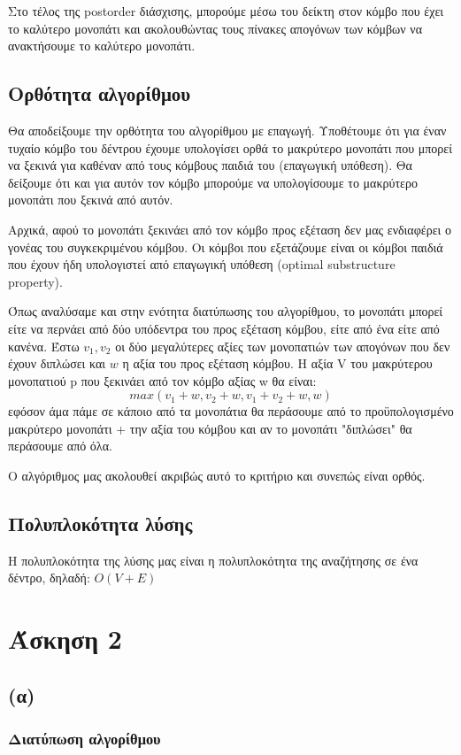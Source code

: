 \documentclass[a4paper,oneside, 11pt]{article}
\begin{document}
Στο τέλος της postorder διάσχισης, μπορούμε μέσω του δείκτη στον κόμβο που έχει το καλύτερο μονοπάτι και ακολουθώντας τους πίνακες απογόνων των κόμβων να ανακτήσουμε το καλύτερο μονοπάτι.

\subsection{Ορθότητα αλγορίθμου}
Θα αποδείξουμε την ορθότητα του αλγορίθμου με επαγωγή. Υποθέτουμε ότι για έναν τυχαίο κόμβο του δέντρου έχουμε υπολογίσει ορθά το μακρύτερο μονοπάτι που μπορεί να ξεκινά για καθέναν από τους κόμβους παιδιά του (επαγωγική υπόθεση). Θα δείξουμε ότι και για αυτόν τον κόμβο μπορούμε να υπολογίσουμε το μακρύτερο μονοπάτι που ξεκινά από αυτόν. \bigbreak 

Αρχικά, αφού το μονοπάτι ξεκινάει από τον κόμβο προς εξέταση δεν μας ενδιαφέρει ο γονέας του συγκεκριμένου κόμβου. Οι κόμβοι που εξετάζουμε είναι οι κόμβοι παιδιά που έχουν ήδη υπολογιστεί από επαγωγική υπόθεση (optimal substructure property). \bigbreak 

Όπως αναλύσαμε και στην ενότητα διατύπωσης του αλγορίθμου, το μονοπάτι μπορεί είτε να περνάει από δύο υπόδεντρα του προς εξέταση κόμβου, είτε από ένα είτε από κανένα. Έστω $v_1, v_2$ οι δύο μεγαλύτερες αξίες των μονοπατιών των απογόνων που δεν έχουν διπλώσει και $w$ η αξία του προς εξέταση κόμβου. H αξία V του μακρύτερου μονοπατιού p που ξεκινάει από τον κόμβο αξίας w θα είναι:
$$
max(v_1 + w, v_2 + w, v_1 + v_2 + w, w)
$$
εφόσον άμα πάμε σε κάποιο από τα μονοπάτια θα περάσουμε από το προϋπολογισμένο μακρύτερο μονοπάτι + την αξία του κόμβου και αν το μονοπάτι "διπλώσει" θα περάσουμε από όλα. \bigbreak 

Ο αλγόριθμος μας ακολουθεί ακριβώς αυτό το κριτήριο και συνεπώς είναι ορθός.
\subsection{Πολυπλοκότητα λύσης}
Η πολυπλοκότητα της λύσης μας είναι η πολυπλοκότητα της αναζήτησης σε ένα δέντρο, δηλαδή: $O(V+E)$
\section{Άσκηση 2}
\subsection{(α)} 

\subsubsection{Διατύπωση αλγορίθμου}
\end{document}
